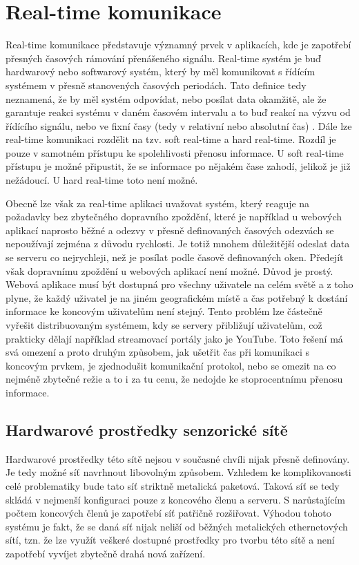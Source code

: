 \chapter{Real-time komunikace}
Real-time komunikace představuje významný prvek v aplikacích, kde je zapotřebí přesných časových rámování přenášeného signálu. Real-time systém je buď hardwarový nebo softwarový systém, který by měl komunikovat s řídícím systémem v přesně stanovených časových periodách. Tato definice tedy neznamená, že by měl systém odpovídat, nebo posílat data okamžitě, ale že garantuje reakci systému v daném časovém intervalu a to buď reakcí na výzvu od řídícího signálu, nebo ve fixní časy (tedy v relativní nebo absolutní čas) \cite{real-time}. Dále lze real-time komunikaci rozdělit na tzv. soft real-time a hard real-time. Rozdíl je pouze v samotném přístupu ke spolehlivosti přenosu informace. U soft real-time přístupu je možné připustit, že se informace po nějakém čase zahodí, jelikož je již nežádoucí. U hard real-time toto není možné.

Obecně lze však za real-time aplikaci uvažovat systém, který reaguje na požadavky bez zbytečného dopravního zpoždění, které je například u webových aplikací naprosto běžné a odezvy v přesně definovaných časových odezvách se nepoužívají zejména z důvodu rychlosti. Je totiž mnohem dů\-le\-ži\-těj\-ší odeslat data se serveru co nejrychleji, než je posílat podle časově definovaných oken. Předejít však dopravnímu zpoždění u webových aplikací není možné. Důvod je prostý. Webová aplikace musí být dostupná pro všechny uživatele na celém světě a z toho plyne, že každý uživatel je na jiném geografickém místě a čas potřebný k dostání informace ke koncovým uživatelům není stejný. Tento problém lze částečně vyřešit distribuovaným systémem, kdy se servery přibližují uživatelům, což prakticky dělají například streamovací portály jako je YouTube. Toto řešení má svá omezení a proto druhým způsobem, jak ušetřit čas při komunikaci s koncovým prvkem, je zjednodušit komunikační protokol, nebo se omezit na co nejméně zbytečné režie a to i za tu cenu, že nedojde ke stoprocentnímu přenosu informace.

\section{Hardwarové prostředky senzorické sítě}
Hardwarové prostředky této sítě nejsou v současné chvíli nijak přesně definovány. Je tedy možné síť navrhnout libovolným způsobem. Vzhledem ke komplikovanosti celé problematiky bude tato síť striktně metalická paketová. Taková síť se tedy skládá v nejmenší konfiguraci pouze z koncového členu a serveru. S narůstajícím počtem koncových členů je zapotřebí síť patřičně rozšiřovat. Výhodou tohoto systému je fakt, že se daná síť nijak neliší od běžných metalických ethernetových sítí, tzn. že lze využít veškeré dostupné prostředky pro tvorbu této sítě a není zapotřebí vyvíjet zbytečně drahá nová zařízení.

